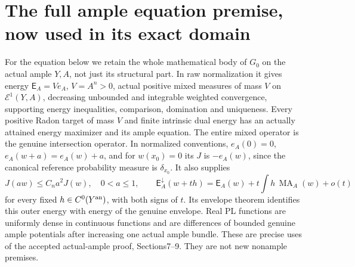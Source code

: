 \documentclass[11pt]{article}
\newcommand{\MA}{\operatorname{MA}}
\begin{document}
\section{The full ample equation premise, now used in its exact domain}
For the equation below we retain the whole mathematical body of $G_0$
on the actual ample $Y,A$, not just its structural part. In raw
normalization it gives energy $\mathsf E_A=V e_A$, $V=A^n>0$,
actual positive mixed measures of mass $V$ on $\mathcal E^1(Y,A)$,
decreasing unbounded and integrable weighted convergence, supporting
energy inequalities, comparison, domination and uniqueness. Every
positive Radon target of mass $V$ and finite intrinsic dual energy
has an actually attained energy maximizer and its ample equation.
The entire mixed operator is the genuine intersection operator.
In normalized conventions, $e_A(0)=0$, $e_A(w+a)=e_A(w)+a$,
and for $w(x_0)=0$ its $J$ is $-e_A(w)$, since the canonical
reference probability measure is $\delta_{x_0}$.
It also supplies
\[
 J(a w)\leq C_n a^2J(w),\quad0<a\leq1,\qquad
 \mathsf E_A^\downarrow(w+th)
  =\mathsf E_A(w)+t\int h\,\MA_A(w)+o(t)                 \tag{14}
\]
for every fixed $h\in C^0(Y^{\rm an})$, with both signs of $t$.
Its envelope theorem identifies this outer energy with energy of
the genuine envelope. Real PL functions are uniformly dense in
continuous functions and are differences of bounded genuine ample
potentials after increasing one actual ample bundle. These are
precise uses of the accepted actual-ample proof, Sections7--9.
They are not new nonample premises.
\end{document}
